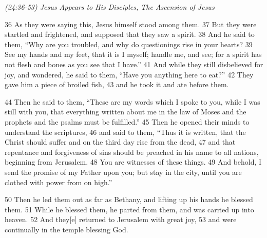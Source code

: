 \documentclass[letterpaper]{report}
\begin{document}
{\centering
	\emph{(24:36-53) Jesus Appears to His Disciples, The Ascension of Jesus}\\
}
\begin{multicols}{2}
36 As they were saying this, Jesus himself stood among them. 37 But they were startled and frightened, and supposed that they saw a spirit. 38 And he said to them, “Why are you troubled, and why do questionings rise in your hearts? 39 See my hands and my feet, that it is I myself; handle me, and see; for a spirit has not flesh and bones as you see that I have.” 41 And while they still disbelieved for joy, and wondered, he said to them, “Have you anything here to eat?” 42 They gave him a piece of broiled fish, 43 and he took it and ate before them.

44 Then he said to them, “These are my words which I spoke to you, while I was still with you, that everything written about me in the law of Moses and the prophets and the psalms must be fulfilled.” 45 Then he opened their minds to understand the scriptures, 46 and said to them, “Thus it is written, that the Christ should suffer and on the third day rise from the dead, 47 and that repentance and forgiveness of sins should be preached in his name to all nations, beginning from Jerusalem. 48 You are witnesses of these things. 49 And behold, I send the promise of my Father upon you; but stay in the city, until you are clothed with power from on high.”

50 Then he led them out as far as Bethany, and lifting up his hands he blessed them. 51 While he blessed them, he parted from them, and was carried up into heaven. 52 And they[e] returned to Jerusalem with great joy, 53 and were continually in the temple blessing God.

\end{multicols}
\end{document}
